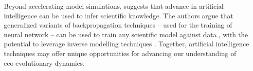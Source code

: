 % 
% 
%
% 
Beyond accelerating model simulations, \cite{Rackauckas2020a} suggests that advance in artificial intelligence can be used to infer scientific knowledge. The authors argue that generalized variants of backpropagation techniques -- used for the training of neural network \citep{LeCun2015}-- can be used to train any scientific model against data \citep{Rackauckas2020}, with the potential to leverage inverse modelling techniques \citep{Frank2022}. %
% 
% 
Together, artificial intelligence techniques may offer unique opportunities for advancing our understanding of eco-evolutionary dynamics.

